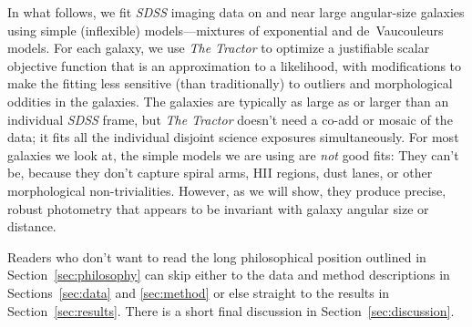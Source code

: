 \documentclass[12pt,preprint,pdftex]{aastex}
\newcommand{\project}[1]{\textsl{#1}}
\newcommand{\sectionname}{Section}
\newcommand{\sectionnames}{\sectionname s}
\begin{document}
In what follows, we fit \project{SDSS} imaging
data on and near large angular-size galaxies using simple (inflexible)
models---mixtures of exponential and de~Vaucouleurs models.  For each
galaxy, we use \project{The Tractor} to
optimize a justifiable scalar objective function that is an
approximation to a likelihood, with modifications to make the fitting
less sensitive (than traditionally) to outliers and morphological
oddities in the galaxies.  The galaxies are typically as large as or
larger than an individual \project{SDSS} frame, but \project{The
  Tractor} doesn't need a co-add or mosaic of the data; it fits all
the individual disjoint science exposures simultaneously.  For most
galaxies we look at, the simple models we are using are \emph{not}
good fits: They can't be, because they don't capture spiral arms, HII
regions, dust lanes, or other morphological non-trivialities.
However, as we will show, they produce precise, robust photometry that
appears to be invariant with galaxy angular size or distance.

Readers who don't want to read the long philosophical position
outlined in \sectionname~\ref{sec:philosophy} can skip either to the
data and method descriptions in \sectionnames~\ref{sec:data} and
\ref{sec:method} or else straight to the results in
\sectionname~\ref{sec:results}.  There is a short final discussion in
\sectionname~\ref{sec:discussion}.
\end{document}
